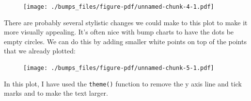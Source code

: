 \documentclass[
  letterpaper,
  DIV=11,
  numbers=noendperiod]{scrreprt}
\newenvironment{Shaded}{\begin{snugshade}}{\end{snugshade}}
\newcommand{\AttributeTok}[1]{\textcolor[rgb]{0.40,0.45,0.13}{#1}}
\newcommand{\DecValTok}[1]{\textcolor[rgb]{0.68,0.00,0.00}{#1}}
\newcommand{\FunctionTok}[1]{\textcolor[rgb]{0.28,0.35,0.67}{#1}}
\newcommand{\NormalTok}[1]{\textcolor[rgb]{0.00,0.23,0.31}{#1}}
\newcommand{\SpecialCharTok}[1]{\textcolor[rgb]{0.37,0.37,0.37}{#1}}
\newcommand{\StringTok}[1]{\textcolor[rgb]{0.13,0.47,0.30}{#1}}
\begin{document}
\begin{figure}[H]

{\centering \texttt{[image: ./bumps\_files/figure-pdf/unnamed-chunk-4-1.pdf]}

}

\end{figure}

There are probably several stylistic changes we could make to this plot
to make it more visually appealing. It's often nice with bump charts to
have the dots be empty circles. We can do this by adding smaller white
points on top of the points that we already plotted:

\begin{Shaded}
\end{Shaded}

\begin{figure}[H]

{\centering \texttt{[image: ./bumps\_files/figure-pdf/unnamed-chunk-5-1.pdf]}

}

\end{figure}

In this plot, I have used the \texttt{theme()} function to remove the y
axis line and tick marks and to make the text larger.
\end{document}

